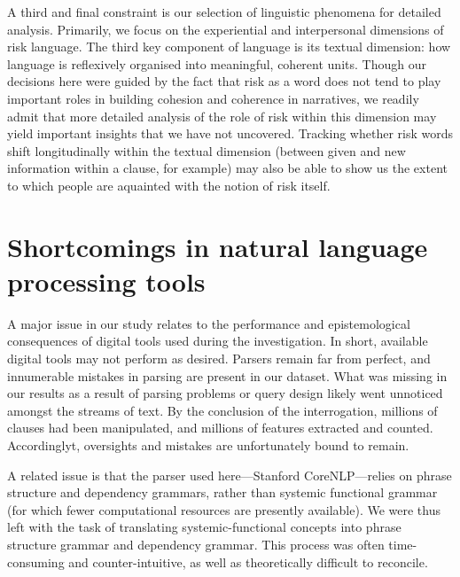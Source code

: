 A third and final constraint is our selection of linguistic phenomena for detailed analysis. Primarily, we focus on the experiential and interpersonal dimensions of risk language. The third key component of language is its textual dimension: how language is reflexively organised into meaningful, coherent units. Though our decisions here were guided by the fact that risk as a word does not tend to play important roles in building cohesion and coherence in narratives, we readily admit that more detailed analysis of the role of risk within this dimension may yield important insights that we have not uncovered. Tracking whether risk words shift longitudinally within the textual dimension (between given and new information within a clause, for example) may also be able to show us the extent to which people are aquainted with the notion of risk itself.


\section{Shortcomings in natural language processing tools}

    A major issue in our study relates to the performance and epistemological consequences of digital tools used during the investigation. In short, available digital tools may not perform as desired. Parsers remain far from perfect, and innumerable mistakes in parsing are present in our dataset. What was missing in our results as a result of parsing problems or query design likely went unnoticed amongst the streams of text. By the conclusion of the interrogation, millions of clauses had been manipulated, and millions of features extracted and counted. Accordinglyt, oversights and mistakes are unfortunately bound to remain.

    A related issue is that the parser used here---Stanford CoreNLP---relies on phrase structure and dependency grammars, rather than systemic functional grammar (for which fewer computational resources are presently available). We were thus left with the task of translating systemic-functional concepts into phrase structure grammar and dependency grammar. This process was often time-consuming and counter-intuitive, as well as theoretically difficult to reconcile.


